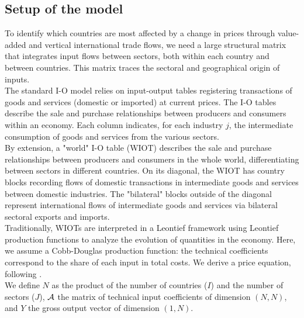 \documentclass[11pt,a4paper]{paper} %
\begin{document}
\subsection{Setup of the model}\label{subsec:piwimsetup}
To identify which countries are most affected by a change in prices through value-added and vertical international trade flows, we need a large structural matrix that integrates input flows between sectors, both within each country and between countries.
This matrix traces the sectoral and geographical origin of inputs. \\
The standard I-O model relies on input-output tables registering transactions of goods and services (domestic or imported) at current prices. The I-O tables describe the sale and purchase relationships between producers and consumers within an economy. Each column indicates, for each industry $j$, the intermediate consumption of goods and services from the various sectors.\\
By extension, a "world" I-O table (WIOT) describes the sale and purchase relationships between producers and consumers in the whole world, differentiating between sectors in different countries.
On its diagonal, the WIOT has country blocks recording flows of domestic transactions in intermediate goods and services between domestic industries.
The "bilateral" blocks outside of the diagonal represent international flows of intermediate goods and services via bilateral sectoral exports and imports. \\
Traditionally, WIOTs are interpreted in a Leontief framework using Leontief production functions to analyze the evolution of quantities in the economy. 
Here, we assume a Cobb-Douglas production function: the technical coefficients correspond to the share of each input in total costs. 
We derive a price equation, following \cite{DeSoyres2018}.\\
We define $N$ as the product of the number of countries ($I$) and the number of sectors ($J$), $\cal A$ the matrix of technical input coefficients of dimension $(N, N)$, and $Y$ the gross output vector of dimension $(1, N)$. \\
\end{document}
